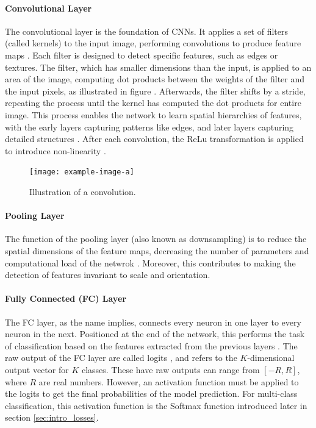 \paragraph{Convolutional Layer}
The convolutional layer is the foundation of CNNs. It applies a set of filters (called kernels) to the input image, performing convolutions to produce feature maps \cite{cs231n}. Each filter is designed to detect specific features, such as edges or textures. The filter, which has smaller dimensions than the input, is applied to an area of the image, computing dot products between the weights of the filter and the input pixels, as illustrated in figure . Afterwards, the filter shifts by a stride, repeating the process until the kernel has computed the dot products for entire image. This process enables the network to learn spatial hierarchies of features, with the early layers capturing patterns like edges, and later layers capturing detailed structures . After each convolution, the ReLu transformation is applied to introduce non-linearity \cite{cs231n}.

\begin{figure}[ht]
    \centering
    \texttt{[image: example-image-a]} 
    \caption{Illustration of a convolution. }
    \label{fig:convolution}
\end{figure}

\paragraph{Pooling Layer}
The function of the pooling layer (also known as downsampling) is to reduce the spatial dimensions of the feature maps, decreasing the number of parameters and computational load of the netwrok \cite{cs231n}. Moreover, this contributes to making the detection of features invariant to scale and orientation.  

\paragraph{Fully Connected (FC) Layer}
The FC layer, as the name implies, connects every neuron in one layer to every neuron in the next. Positioned at the end of the network, this performs the task of classification based on the features extracted from the previous layers \cite{cs231n}. The raw output of the FC layer are called logits \cite{arora2024logits}, and refers to the $K$-dimensional output vector for $K$ classes. These have raw outputs can range from $[-R,R]$, where $R$ are real numbers. However, an activation function must be applied to the logits to get the final probabilities of the model prediction. For multi-class classification, this activation function is the Softmax function introduced later in section \ref{sec:intro_losses}.
\vspace{1em}

